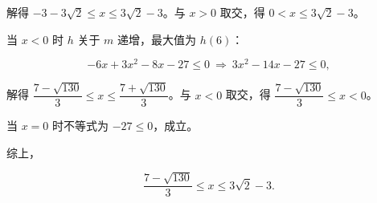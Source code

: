\begin{answer}
解得 $-3-3\sqrt2\leqslant x\leqslant3\sqrt2-3$。与 $x>0$ 取交，得 $0<x\leqslant3\sqrt2-3$。

当 $x<0$ 时 $h$ 关于 $m$ 递增，最大值为 $h(6)$：

\nopagebreak[4]
\[-6x+3x^2-8x-27\leqslant0\ \Rightarrow\ 3x^2-14x-27\leqslant0,\]

解得 $\dfrac{7-\sqrt{130}}3\leqslant x\leqslant\dfrac{7+\sqrt{130}}3$。与 $x<0$ 取交，得 $\dfrac{7-\sqrt{130}}3\leqslant x<0$。

当 $x=0$ 时不等式为 $-27\leqslant0$，成立。

综上，

\nopagebreak[4]
\[\frac{7-\sqrt{130}}3\leqslant x\leqslant3\sqrt2-3.\]


\end{answer}